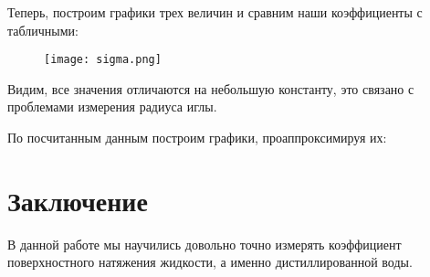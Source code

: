 \documentclass[a4paper, 12pt]{article}
\begin{document}
    Теперь, построим графики трех величин и сравним наши коэффициенты с табличными:

    \begin{figure}[h]
        \centering
        \texttt{[image: sigma.png]}
    \end{figure}  

    Видим, все значения отличаются на небольшую константу, это связано с проблемами измерения радиуса иглы.

    По посчитанным данным построим графики, проаппроксимируя их:
  
    
\section {Заключение}
    В данной работе мы научились довольно точно измерять коэффициент поверхностного натяжения жидкости, а именно дистиллированной воды. 
\end{document}
